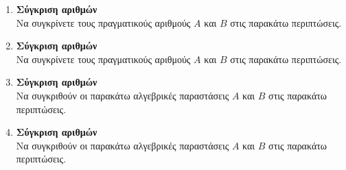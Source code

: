 \documentclass[twoside,nofonts,internet]{askhseis}
\begin{document}
\begin{enumerate}
\begin{multicols}{3}
\end{multicols}
\item \textbf{Σύγκριση αριθμών}\\
Να συγκρίνετε τους πραγματικούς αριθμούς $ A $ και $ B $ στις παρακάτω περιπτώσεις.
\item \textbf{Σύγκριση αριθμών}\\
Να συγκρίνετε τους πραγματικούς αριθμούς $ A $ και $ B $ στις παρακάτω περιπτώσεις.
\item \textbf{Σύγκριση αριθμών}\\
Να συγκριθούν οι παρακάτω αλγεβρικές παραστάσεις $ A $ και $ B $ στις παρακάτω περιπτώσεις.
\item \textbf{Σύγκριση αριθμών}\\
Να συγκριθούν οι παρακάτω αλγεβρικές παραστάσεις $ A $ και $ B $ στις παρακάτω περιπτώσεις.
\end{enumerate}
\end{document}
